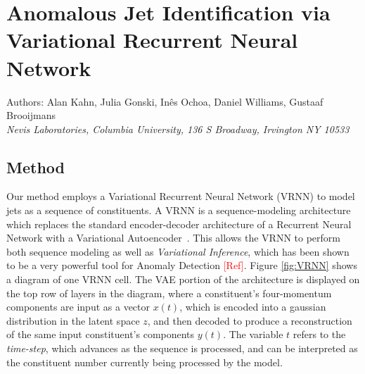 \documentclass[letterpaper,11pt]{article}
\begin{document}
\section*{Anomalous Jet Identification via Variational Recurrent Neural Network}
Authors: Alan Kahn, Julia Gonski, In\^{e}s Ochoa, Daniel Williams, Gustaaf Brooijmans \\ \textit{Nevis Laboratories, Columbia University, 136 S Broadway, Irvington NY 10533}\\


\subsection{Method}
\label{sec:method}


Our method employs a Variational Recurrent Neural Network (VRNN) to model jets as a sequence of constituents. A VRNN is a sequence-modeling architecture which replaces the standard encoder-decoder architecture of a Recurrent Neural Network with a Variational Autoencoder~\cite{chung2016recurrent}. 
This allows the VRNN to perform both sequence modeling as well as \textit{Variational Inference}, which has been shown to be a very powerful tool for Anomaly Detection \textcolor{red}{[Ref]}. 
Figure \ref{fig:VRNN} shows a diagram of one VRNN cell. The VAE portion of the architecture is displayed on the top row of layers in the diagram, where a constituent's four-momentum components are input as a vector $x(t)$, which is encoded into a gaussian distribution in the latent space $z$, and then decoded to produce a reconstruction of the same input constituent's components $y(t)$. The variable $t$ refers to the \textit{time-step}, which advances as the sequence is processed, and can be interpreted as the constituent number currently being processed by the model. 
\end{document}
